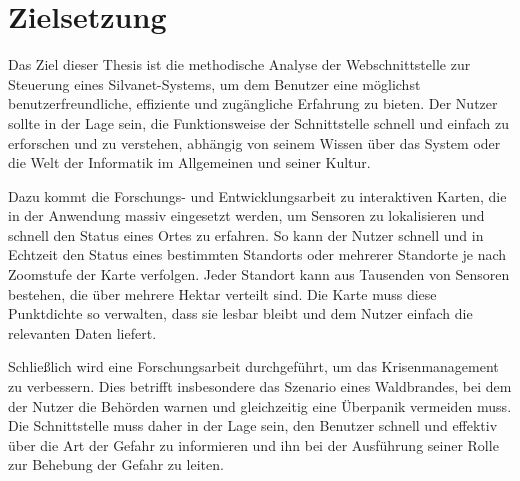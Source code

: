 \section{Zielsetzung}

Das Ziel dieser Thesis ist die methodische Analyse der Webschnittstelle zur Steuerung eines Silvanet-Systems, um dem Benutzer eine möglichst benutzerfreundliche, effiziente und zugängliche Erfahrung zu bieten.
Der Nutzer sollte in der Lage sein, die Funktionsweise der Schnittstelle schnell und einfach zu erforschen und zu verstehen, abhängig von seinem Wissen über das System oder die Welt der Informatik im Allgemeinen und seiner Kultur.

Dazu kommt die Forschungs- und Entwicklungsarbeit zu interaktiven Karten, die in der Anwendung massiv eingesetzt werden, um Sensoren zu lokalisieren und schnell den Status eines Ortes zu erfahren.
So kann der Nutzer schnell und in Echtzeit den Status eines bestimmten Standorts oder mehrerer Standorte je nach Zoomstufe der Karte verfolgen.
Jeder Standort kann aus Tausenden von Sensoren bestehen, die über mehrere Hektar verteilt sind. Die Karte muss diese Punktdichte so verwalten, dass sie lesbar bleibt und dem Nutzer einfach die relevanten Daten liefert.

Schließlich wird eine Forschungsarbeit durchgeführt, um das Krisenmanagement zu verbessern.
Dies betrifft insbesondere das Szenario eines Waldbrandes, bei dem der Nutzer die Behörden warnen und gleichzeitig eine Überpanik vermeiden muss.
Die Schnittstelle muss daher in der Lage sein, den Benutzer schnell und effektiv über die Art der Gefahr zu informieren und ihn bei der Ausführung seiner Rolle zur Behebung der Gefahr zu leiten.
